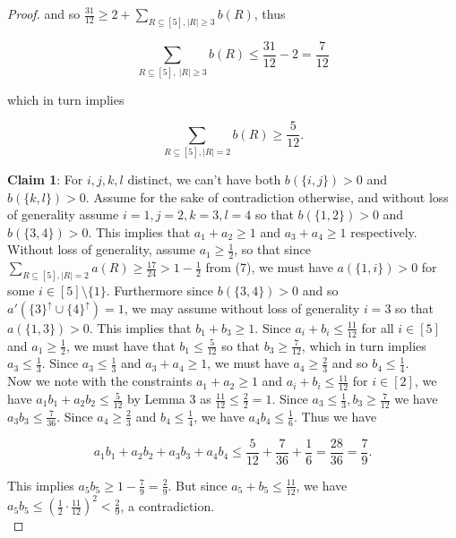 \documentclass{article}
\begin{document}
\begin{proof}
\noindent
and so $\frac{31}{12} \geq 2 + \sum_{R \subseteq [5], |R| \geq 3} b(R)$, thus

$$\sum_{R \subseteq [5], \ |R| \geq 3} b(R) \leq \frac{31}{12} - 2 = \frac{7}{12}$$

\noindent
which in turn implies

\begin{equation}
\sum_{R \subseteq [5],|R| = 2} b(R) \geq \frac{5}{12}.
\end{equation}

\textbf{Claim 1}: For $i,j,k,l$ distinct, we can't have both $b(\{i,j\}) >0$ and $b(\{k,l\}) > 0$. Assume for the sake of contradiction otherwise, and without loss of generality assume $i = 1, j = 2, k = 3, l = 4$ so that $b(\{1,2\}) > 0$ and $b(\{3,4\}) > 0$. This implies that $a_1 + a_2 \geq 1$ and $a_3 + a_4 \geq 1$ respectively. Without loss of generality, assume $a_1 \geq \frac{1}{2}$, so that since $\sum_{R \subseteq [5], |R| = 2} a(R) \geq \frac{17}{24} > 1 - \frac{1}{2}$ from (7), we must have $a(\{1,i\}) > 0$ for some $i \in [5] \setminus \{1\}$. Furthermore since $b(\{3,4\}) > 0$ and so $a'(\{3\}^{\uparrow} \cup \{4\}^{\uparrow}) = 1$, we may assume without loss of generality $i = 3$ so that $a(\{1,3\}) > 0$. This implies that $b_1 + b_3 \geq 1$. Since $a_i + b_i \leq \frac{11}{12}$ for all $i \in [5]$ and $a_1 \geq \frac{1}{2}$, we must have that $b_1 \leq \frac{5}{12}$ so that $b_3 \geq \frac{7}{12}$, which in turn implies $a_3 \leq \frac{1}{3}$. Since $a_3 \leq \frac{1}{3}$ and $a_3 + a_4 \geq 1$, we must have $a_4 \geq \frac{2}{3}$ and so $b_4 \leq \frac{1}{4}$. \\

Now we note with the constraints $a_1 + a_2 \geq 1$ and $a_i+b_i \leq \frac{11}{12}$ for $i \in [2]$, we have $a_1b_1 + a_2b_2 \leq \frac{5}{12}$ by Lemma 3 as $\frac{11}{12} \leq \frac{2}{2} 
= 1$. Since $a_3 \leq \frac{1}{3}, b_3 \geq \frac{7}{12}$ we have $a_3b_3 \leq \frac{7}{36}$. Since $a_4 \geq \frac{2}{3}$ and $b_4 \leq \frac{1}{4}$, we have $a_4b_4 \leq \frac{1}{6}$. Thus we have

$$a_1b_1 + a_2b_2 + a_3b_3 + a_4b_4 \leq \frac{5}{12} + \frac{7}{36} + \frac{1}{6} = \frac{28}{36} = \frac{7}{9}.$$

\noindent
This implies $a_5b_5 \geq 1 - \frac{7}{9} = \frac{2}{9}$. But since $a_5 + b_5 \leq \frac{11}{12}$, we have $a_5b_5 \leq (\frac{1}{2} \cdot \frac{11}{12})^2 < \frac{2}{9}$, a contradiction. \\


\end{proof}
\end{document}
